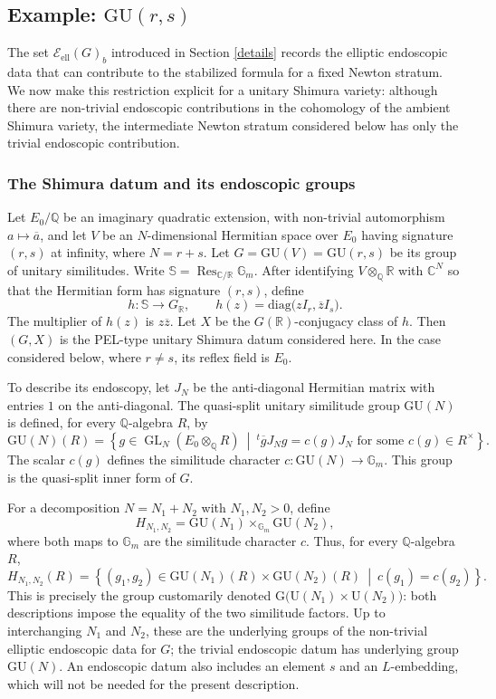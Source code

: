 \documentclass[11pt,a4paper]{article}
\newcommand{\Eell}{\mathcal{E}_{\mathrm{ell}}}
\theoremstyle{definition}
\theoremstyle{plain}
\theoremstyle{remark}
\theoremstyle{plain}
\DeclareMathOperator{\GL}{GL}
\DeclareMathOperator{\Res}{Res}
\begin{document}
\subsection{Example: $\mathrm{GU}(r,s)$}\label{GUexample}
The set $\Eell(G)_b$ introduced in Section \ref{details} records the elliptic endoscopic data that can contribute to the stabilized formula for a fixed Newton stratum. We now make this restriction explicit for a unitary Shimura variety: although there are non-trivial endoscopic contributions in the cohomology of the ambient Shimura variety, the intermediate Newton stratum considered below has only the trivial endoscopic contribution.

\subsubsection{The Shimura datum and its endoscopic groups}
Let $E_0/\mathbb{Q}$ be an imaginary quadratic extension, with non-trivial automorphism $a\mapsto\overline{a}$, and let $V$ be an $N$-dimensional Hermitian space over $E_0$ having signature $(r,s)$ at infinity, where $N=r+s$. Let $G=\mathrm{GU}(V)=\mathrm{GU}(r,s)$ be its group of unitary similitudes. Write $\mathbb{S}=\Res_{\mathbb{C}/\mathbb{R}}\mathbb{G}_m$. After identifying $V\otimes_{\mathbb Q}\mathbb R$ with $\mathbb C^N$ so that the Hermitian form has signature $(r,s)$, define
$$
h:\mathbb{S}\longrightarrow G_{\mathbb R},
\qquad
h(z)=\mathrm{diag}\bigl(zI_r,\overline{z}I_s\bigr).
$$
The multiplier of $h(z)$ is $z\overline{z}$. Let $X$ be the $G(\mathbb R)$-conjugacy class of $h$. Then $(G,X)$ is the PEL-type unitary Shimura datum considered here. In the case considered below, where $r\ne s$, its reflex field is $E_0$.

To describe its endoscopy, let $J_N$ be the anti-diagonal Hermitian matrix with entries $1$ on the anti-diagonal. The quasi-split unitary similitude group $\mathrm{GU}(N)$ is defined, for every $\mathbb{Q}$-algebra $R$, by
$$
\mathrm{GU}(N)(R)
=
\left\{
g\in\GL_N(E_0\otimes_{\mathbb Q}R)
\ \middle|\
{}^t\!\overline{g}J_Ng=c(g)J_N
\text{ for some }c(g)\in R^\times
\right\}.
$$
The scalar $c(g)$ defines the similitude character $c:\mathrm{GU}(N)\rightarrow\mathbb{G}_m$. This group is the quasi-split inner form of $G$.

For a decomposition $N=N_1+N_2$ with $N_1,N_2>0$, define
$$
H_{N_1,N_2}
=\mathrm{GU}(N_1)\times_{\mathbb G_m}\mathrm{GU}(N_2),
$$
where both maps to $\mathbb G_m$ are the similitude character $c$. Thus, for every $\mathbb Q$-algebra $R$,
$$
H_{N_1,N_2}(R)
=
\left\{
(g_1,g_2)\in\mathrm{GU}(N_1)(R)\times\mathrm{GU}(N_2)(R)
\ \middle|\ c(g_1)=c(g_2)
\right\}.
$$
This is precisely the group customarily denoted $\mathrm{G}\bigl(\mathrm{U}(N_1)\times\mathrm{U}(N_2)\bigr)$: both descriptions impose the equality of the two similitude factors.
Up to interchanging $N_1$ and $N_2$, these are the underlying groups of the non-trivial elliptic endoscopic data for $G$; the trivial endoscopic datum has underlying group $\mathrm{GU}(N)$. An endoscopic datum also includes an element $s$ and an $L$-embedding, which will not be needed for the present description.
\end{document}
